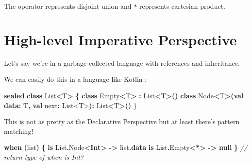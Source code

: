\documentclass[
]{book}
\newenvironment{Shaded}{\begin{snugshade}}{\end{snugshade}}
\newcommand{\CommentTok}[1]{\textcolor[rgb]{0.56,0.35,0.01}{\textit{#1}}}
\newcommand{\ControlFlowTok}[1]{\textcolor[rgb]{0.13,0.29,0.53}{\textbf{#1}}}
\newcommand{\DataTypeTok}[1]{\textcolor[rgb]{0.13,0.29,0.53}{#1}}
\newcommand{\KeywordTok}[1]{\textcolor[rgb]{0.13,0.29,0.53}{\textbf{#1}}}
\newcommand{\NormalTok}[1]{#1}
\newcommand{\OperatorTok}[1]{\textcolor[rgb]{0.81,0.36,0.00}{\textbf{#1}}}
\newcommand{\VariableTok}[1]{\textcolor[rgb]{0.00,0.00,0.00}{#1}}
\begin{document}
The \texttt{\textbar{}} operator represents disjoint union and \texttt{*} represents cartesian product.

\hypertarget{high-level-imperative-perspective}{%
\section{High-level Imperative Perspective}\label{high-level-imperative-perspective}}

Let's say we're in a garbage collected language with references and inheritance.

We can easily do this in a language like Kotlin :

\begin{Shaded}
\begin{Highlighting}[]
\KeywordTok{sealed} \KeywordTok{class}\NormalTok{ List}\OperatorTok{\textless{}}\DataTypeTok{T}\OperatorTok{\textgreater{}} \OperatorTok{\{}
    \KeywordTok{class}\NormalTok{ Empty}\OperatorTok{\textless{}}\DataTypeTok{T}\OperatorTok{\textgreater{}} \OperatorTok{:} \DataTypeTok{List}\OperatorTok{\textless{}}\DataTypeTok{T}\OperatorTok{\textgreater{}()}
    \KeywordTok{class}\NormalTok{ Node}\OperatorTok{\textless{}}\DataTypeTok{T}\OperatorTok{\textgreater{}(}\KeywordTok{val} \KeywordTok{data}\OperatorTok{:} \DataTypeTok{T}\OperatorTok{,} \KeywordTok{val} \VariableTok{next}\OperatorTok{:} \DataTypeTok{List}\NormalTok{\textless{}}\VariableTok{T}\NormalTok{\textgreater{}}\OperatorTok{):} \DataTypeTok{List}\OperatorTok{\textless{}}\DataTypeTok{T}\OperatorTok{\textgreater{}()}
\NormalTok{\}}
\end{Highlighting}
\end{Shaded}

This is not as pretty as the Declarative Perspective but at least there's pattern matching!

\begin{Shaded}
\begin{Highlighting}[]
\ControlFlowTok{when} \OperatorTok{(}\NormalTok{list}\OperatorTok{)} \OperatorTok{\{}
    \KeywordTok{is}\NormalTok{ List}\OperatorTok{.}\NormalTok{Node}\OperatorTok{\textless{}}\KeywordTok{Int}\OperatorTok{\textgreater{}} \OperatorTok{{-}\textgreater{}}\NormalTok{ list}\OperatorTok{.}\KeywordTok{data}
    \KeywordTok{is}\NormalTok{ List}\OperatorTok{.}\NormalTok{Empty}\OperatorTok{\textless{}*\textgreater{}} \OperatorTok{{-}\textgreater{}} \KeywordTok{null}
\OperatorTok{\}} \CommentTok{// return type of when is \textasciigrave{}Int?\textasciigrave{}}
\end{Highlighting}
\end{Shaded}
\end{document}
